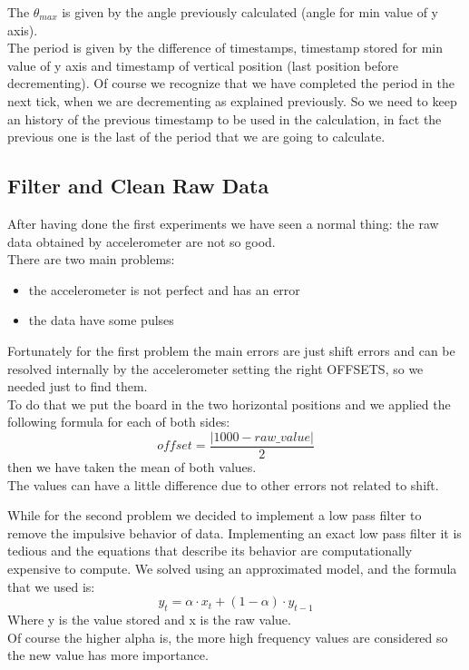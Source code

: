 The $\theta_{max}$ is given by the  angle previously calculated (angle for min value of y axis).\\
The period is given by the difference of timestamps, timestamp stored for min value of y axis and timestamp of vertical position (last position before decrementing).
Of course we recognize that we have completed the period in the next tick, when we are decrementing as explained previously. So we need to keep an history of the previous timestamp to be used in the calculation, in fact the previous one is the last of the period that we are going to calculate.

\subsection{Filter and Clean Raw Data}
After having done the first experiments we have seen a normal thing: the raw data obtained by accelerometer are not so good.\\
There are two main problems:
\begin{itemize}
	\item the accelerometer is not perfect and has an error
	\item the data have some pulses
\end{itemize} \par

Fortunately for the first problem the main errors are just shift errors and can be resolved internally by the accelerometer setting the right OFFSETS, so we needed just to find them.\\
To do that we put the board in the two horizontal positions and we applied the following formula for each of both sides:
$$ offset = \frac{\left|1000-raw\_value\right|}{2}$$
then we have taken the mean of both values. \\
The values can have a little difference due to other errors not related to shift.\par

While for the second problem we decided to implement a low pass filter to remove the impulsive behavior of data. Implementing an exact low pass filter it is tedious and the equations that describe its behavior are computationally expensive to compute. We solved using an approximated model, and the formula \cite{Holt20045} that we used is:
$$ y_t = \alpha \cdot x_t + (1-\alpha) \cdot y_{t-1}$$
Where y is the value stored and x is the raw value.\\
Of course the higher alpha is, the more high frequency values are considered so the new value has more importance.\par

